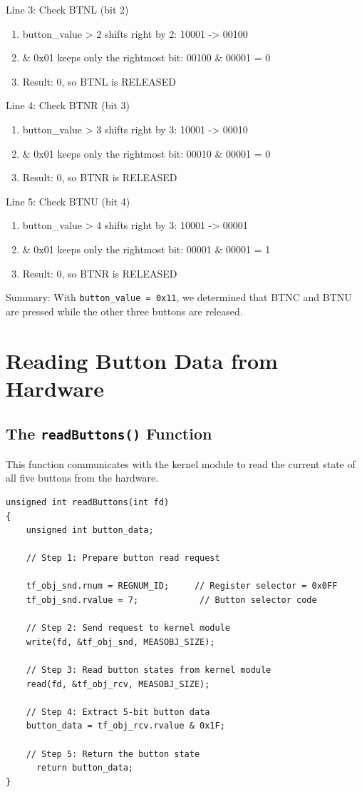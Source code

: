 Line 3: Check BTNL (bit 2)
\begin{enumerate}
\item button\_value \>> 2 shifts right by 2: 10001 -> 00100
\item \& 0x01 keeps only the rightmost bit: 00100 \& 00001 = 0
\item Result: 0, so BTNL is RELEASED
\end{enumerate}

Line 4: Check BTNR (bit 3)

\begin{enumerate}
\item button\_value \>> 3 shifts right by 3: 10001 -> 00010
\item \& 0x01 keeps only the rightmost bit: 00010 \& 00001 = 0
\item Result: 0, so BTNR is RELEASED
\end{enumerate}

Line 5: Check BTNU (bit 4)
\begin{enumerate}
\item button\_value \>> 4 shifts right by 3: 10001 -> 00001
\item \& 0x01 keeps only the rightmost bit: 00001 \& 00001 = 1
\item Result: 0, so BTNR is RELEASED
\end{enumerate}

Summary: With \texttt{button\_value = 0x11}, we determined that BTNC and BTNU are pressed while the other three buttons are released.

\section{Reading Button Data from Hardware}
\subsection{The \texttt{readButtons()} Function}
This function communicates with the kernel module to read the current state of all five buttons from the hardware.

\begin{verbatim}
unsigned int readButtons(int fd)
{
    unsigned int button_data;
    
    // Step 1: Prepare button read request

    tf_obj_snd.rnum = REGNUM_ID;     // Register selector = 0x0FF
    tf_obj_snd.rvalue = 7;            // Button selector code
    
    // Step 2: Send request to kernel module
    write(fd, &tf_obj_snd, MEASOBJ_SIZE);
    
    // Step 3: Read button states from kernel module
    read(fd, &tf_obj_rcv, MEASOBJ_SIZE);
    
    // Step 4: Extract 5-bit button data
    button_data = tf_obj_rcv.rvalue & 0x1F;
    
    // Step 5: Return the button state
      return button_data;    
}
\end{verbatim}

